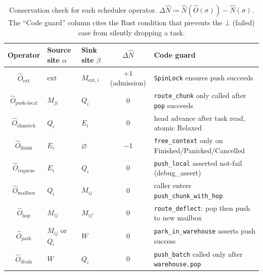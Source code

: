 \documentclass[11pt,a4paper]{report}
\newcommand{\Num}{\hat{N}}
\newcommand{\code}[1]{\texttt{#1}}
\begin{document}
\begin{table}[h]
\centering
\small
\caption{Conservation check for each scheduler operator.
$\Delta\Num \coloneqq \Num(\hat{O}(\sigma)) - \Num(\sigma)$.
The ``Code guard'' column cites the Rust condition that prevents the
$\bot$ (failed) case from silently dropping a task.}
\label{tab:conserve}
\begin{tabularx}{\textwidth}{@{}clXcX@{}}
\toprule
Operator & Source site $\alpha$ & Sink site $\beta$
         & $\Delta\Num$ & Code guard \\
\midrule
$\hat{O}_{\text{ext}}$
  & $\text{ext}$ & $M_{\text{ext},i}$
  & $+1$ (admission) & \code{SpinLock} ensures push succeeds \\
$\hat{O}_{\text{push-local}}$
  & $M_{ji}$ & $Q_i$
  & $0$ & \code{route\_chunk} only called after \code{pop} succeeds \\
$\hat{O}_{\text{dispatch}}$
  & $Q_i$ & $E_i$
  & $0$ & head advance after task read, atomic Relaxed \\
$\hat{O}_{\text{finish}}$
  & $E_i$ & $\varnothing$
  & $-1$ & \code{free\_context} only on Finished/Panicked/Cancelled \\
$\hat{O}_{\text{requeue}}$
  & $E_i$ & $Q_i$
  & $0$ & \code{push\_local} asserted not-fail (debug\_assert) \\
$\hat{O}_{\text{mailbox}}$
  & $Q_i$ & $M_{ij}$
  & $0$ & caller enters \code{push\_chunk\_with\_hop} \\
$\hat{O}_{\text{hop}}$
  & $M_{ij}$ & $M_{ij'}$
  & $0$ & \code{route\_deflect}: pop then push to new mailbox \\
$\hat{O}_{\text{park}}$
  & $M_{ij}$ or $Q_i$ & $W$
  & $0$ & \code{park\_in\_warehouse} asserts push success \\
$\hat{O}_{\text{drain}}$
  & $W$ & $Q_i$
  & $0$ & \code{push\_batch} called only after \code{warehouse.pop} \\
\bottomrule
\end{tabularx}
\end{table}
\end{document}
